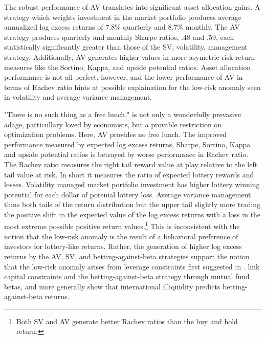 The robust performance of AV translates into significant asset allocation gains. A strategy which weights investment in the market portfolio produces average annualized log excess returns of 7.8\% quarterly and 8.7\% monthly. The AV strategy produces quarterly and monthly Sharpe ratios, .48 and .59, each statistically significantly greater than those of the SV, volatility, management strategy. Additionally, AV generates higher values in more asymetric risk-return measures like the Sortino, Kappa, and upside potential ratios. Asset allocation performance is not all perfect, however, and the lower performance of AV in terms of Rachev ratio hints at possible explaination for the low-risk anomaly seen in volatility and average variance management. 

"There is no such thing as a free lunch," is not only a wonderfully prevasive adage, particullary loved by economists, but a provable restriction on optimization problems.\citep{wolpert_no_1997} Here, AV provides no free lunch. The improved performance measured by expected log excess returns, Sharpe, Sortino, Kappa and upside potential ratios is betrayed by worse performance in Rachev ratio. The Rachev ratio measures the right tail reward value at play relative to the left tail value at risk. In short it measures the ratio of expected lottery rewards and losses. Volatility managed market portfolio investment has higher lottery winning potential for each dollar of potenial lottery loss. Average variance management thins both tails of the return distribution but the upper tail slightly more trading the positive shift in the expected value of the log excess returns with a loss in the most extreme possible positive return values.\footnote{Both SV and AV generate better Rachev ratios than the buy and hold return.} This is inconsistent with the notion that the low-risk anomaly is the result of a behavioral preference of investors for lottery-like returns.\citep{barberis_stocks_2008,brunnermeier_optimal_2007} Rather, the generation of higher log excess returns by the AV, SV, and betting-against-beta strategies support the notion that the low-risk anomaly arises from leverage constraints first suggested in \citet{jensen1972capital}. \citet{boguth_leverage_2018} link capital constraints and the betting-against-beta strategy through mutual fund betas, and more generally \citet{malkhozov_international_2017} show that international illiquidity predicts betting-against-beta returns. 

